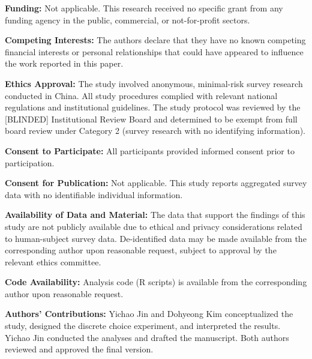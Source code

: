 \documentclass[12pt]{article}
\begin{document}
\vspace{0.5em}
\noindent\textbf{Funding:} Not applicable. This research received no specific grant from any funding agency in the public, commercial, or not-for-profit sectors.

\vspace{0.5em}
\noindent\textbf{Competing Interests:} The authors declare that they have no known competing financial interests or personal relationships that could have appeared to influence the work reported in this paper.

\vspace{0.5em}
\noindent\textbf{Ethics Approval:} The study involved anonymous, minimal-risk survey research conducted in China. All study procedures complied with relevant national regulations and institutional guidelines. The study protocol was reviewed by the [BLINDED] Institutional Review Board and determined to be exempt from full board review under Category 2 (survey research with no identifying information).

\vspace{0.5em}
\noindent\textbf{Consent to Participate:} All participants provided informed consent prior to participation.

\vspace{0.5em}
\noindent\textbf{Consent for Publication:} Not applicable. This study reports aggregated survey data with no identifiable individual information.

\vspace{0.5em}
\noindent\textbf{Availability of Data and Material:} The data that support the findings of this study are not publicly available due to ethical and privacy considerations related to human-subject survey data. De-identified data may be made available from the corresponding author upon reasonable request, subject to approval by the relevant ethics committee.

\vspace{0.5em}
\noindent\textbf{Code Availability:} Analysis code (R scripts) is available from the corresponding author upon reasonable request.

\vspace{0.5em}
\noindent\textbf{Authors' Contributions:} Yichao Jin and Dohyeong Kim conceptualized the study, designed the discrete choice experiment, and interpreted the results. Yichao Jin conducted the analyses and drafted the manuscript. Both authors reviewed and approved the final version.
\end{document}
